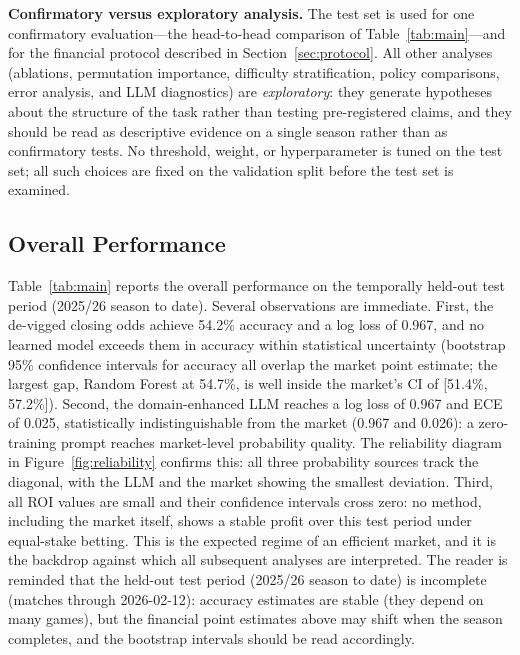 \label{sec:experiments}

\noindent\textbf{Confirmatory versus exploratory analysis.} The test
set is used for one confirmatory evaluation---the head-to-head
comparison of Table~\ref{tab:main}---and for the financial protocol
described in Section~\ref{sec:protocol}. All other analyses
(ablations, permutation importance, difficulty stratification,
policy comparisons, error analysis, and LLM diagnostics) are
\emph{exploratory}: they generate hypotheses about the structure of
the task rather than testing pre-registered claims, and they should
be read as descriptive evidence on a single season rather than as
confirmatory tests. No threshold, weight, or hyperparameter is tuned
on the test set; all such choices are fixed on the validation split
before the test set is examined.

\subsection{Overall Performance}


Table~\ref{tab:main} reports the overall performance on the
temporally held-out test period (2025/26 season to date). Several observations are immediate. First, the de-vigged
closing odds achieve 54.2\% accuracy and a log loss of 0.967, and no
learned model exceeds them in accuracy within statistical uncertainty
(bootstrap 95\% confidence intervals for accuracy all overlap the
market point estimate; the largest gap, Random Forest at 54.7\%, is
well inside the market's CI of [51.4\%, 57.2\%]). Second, the
domain-enhanced LLM reaches a log loss of 0.967 and ECE of 0.025,
statistically indistinguishable from the market (0.967 and 0.026):
a zero-training prompt reaches market-level probability quality.
The reliability diagram in Figure~\ref{fig:reliability} confirms
this: all three probability sources track the diagonal, with the LLM
and the market showing the smallest deviation.
Third, all ROI values are small and their confidence intervals
cross zero: no method, including the market itself, shows a stable
profit over this test period under equal-stake betting. This is the
expected regime of an efficient market, and it is the backdrop
against which all subsequent analyses are interpreted. The reader is
reminded that the held-out test period (2025/26 season to date) is
incomplete (matches through 2026-02-12): accuracy estimates are stable (they depend on many
games), but the financial point estimates above may shift when the
season completes, and the bootstrap intervals should be read
accordingly.

